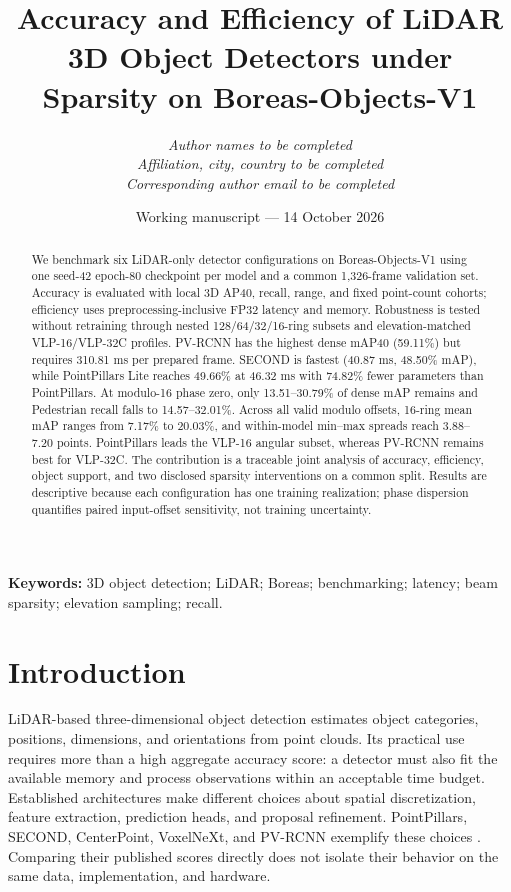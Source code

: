 \documentclass[10pt,twocolumn]{article}
\title{Accuracy and Efficiency of LiDAR 3D Object Detectors under Sparsity on Boreas-Objects-V1}
\author{\textit{Author names to be completed}\\
\small \textit{Affiliation, city, country to be completed}\\
\small \textit{Corresponding author email to be completed}}
\date{Working manuscript --- 14 October 2026}
\begin{document}
\maketitle
\begin{center}
\small{}
\end{center}

\begin{abstract}
We benchmark six LiDAR-only detector configurations on Boreas-Objects-V1 using one seed-42 epoch-80 checkpoint per model and a common 1,326-frame validation set. Accuracy is evaluated with local 3D AP40, recall, range, and fixed point-count cohorts; efficiency uses preprocessing-inclusive FP32 latency and memory. Robustness is tested without retraining through nested 128/64/32/16-ring subsets and elevation-matched VLP-16/VLP-32C profiles. PV-RCNN has the highest dense mAP40 (59.11\%) but requires 310.81 ms per prepared frame. SECOND is fastest (40.87 ms, 48.50\% mAP), while PointPillars Lite reaches 49.66\% at 46.32 ms with 74.82\% fewer parameters than PointPillars. At modulo-16 phase zero, only 13.51--30.79\% of dense mAP remains and Pedestrian recall falls to 14.57--32.01\%. Across all valid modulo offsets, 16-ring mean mAP ranges from 7.17\% to 20.03\%, and within-model min--max spreads reach 3.88--7.20 points. PointPillars leads the VLP-16 angular subset, whereas PV-RCNN remains best for VLP-32C. The contribution is a traceable joint analysis of accuracy, efficiency, object support, and two disclosed sparsity interventions on a common split. Results are descriptive because each configuration has one training realization; phase dispersion quantifies paired input-offset sensitivity, not training uncertainty.
\end{abstract}
\noindent\textbf{Keywords:} 3D object detection; LiDAR; Boreas; benchmarking; latency; beam sparsity; elevation sampling; recall.

\section{Introduction}
LiDAR-based three-dimensional object detection estimates object categories, positions, dimensions, and orientations from point clouds. Its practical use requires more than a high aggregate accuracy score: a detector must also fit the available memory and process observations within an acceptable time budget. Established architectures make different choices about spatial discretization, feature extraction, prediction heads, and proposal refinement. PointPillars, SECOND, CenterPoint, VoxelNeXt, and PV-RCNN exemplify these choices \cite{lang2019pointpillars,yan2018second,yin2021centerpoint,chen2023voxelnext,shi2020pvrcnn}. Comparing their published scores directly does not isolate their behavior on the same data, implementation, and hardware.
\end{document}
